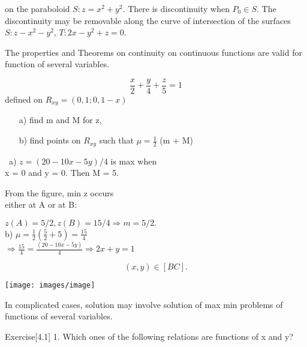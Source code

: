 \documentclass[11 pt]{amsbook}
\begin{document}

on the paraboloid $ S: z = x^2 + y^2$. There is discontinuity when $P_0 \in S$. The discontinuity may be removable along the curve of intersection of the surfaces $ S: z - x^2 - y^2$, $ T: 2x - y^2 + z = 0$. \par
The properties and Theorems on continuity on continuous functions are valid for function of several variables.
\begin{exmp}

\begin{equation}
\frac{x}{2} + \frac{y}{4} + \frac{z}{5} = 1
\end{equation}
defined on $R_{xy} = (0, 1; 0, 1-x)$
\begin{itemize}
\item[a)] find m and M for z,
\end{itemize}
\begin{itemize}
\item[b)] find points on $R_{xy}$ such that $\mu = \frac{1}{2}$ (m + M)
\end{itemize}
\end{exmp}
\begin{hSolution}

\begin{minipage}{0.6\textwidth}\
a) $ z = (20 - 10x - 5y)/4$ is max when\\

x = 0 and y = 0. Then M = 5.\par

From the figure, min z occurs\\

 either at A or at B:\par


$z(A) = 5/2, z(B) = 15/4 \Rightarrow m=5/2.$\\

b) $\mu = \frac{1}{2} ( \frac{5}{2} + 5) = \frac{15}{4}$ \\

$\Rightarrow \frac{15}{4} = \frac{(20 - 10x - 5y)}{4} \Rightarrow 2x +y = 1$

\begin{equation}
(x, y) \in [BC].
\end{equation}
\end{minipage}
\noindent\begin{minipage}{0.3\textwidth}\flushright
\texttt{[image: images/image]}
\end{minipage}%

\par 

In complicated cases, solution may involve solution of max min problems of functions of several variables.
\end{hSolution}
\begin{exercise}{Exercise}[4.1]
1. Which ones of the following relations are functions of x and y?
\end{exercise}
\end{document}
